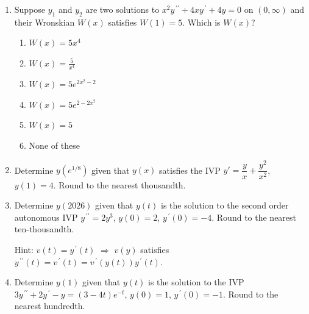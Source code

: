 \documentclass{ximera}
\newenvironment{mcenum}
{ \begin{enumerate}[itemsep=1em, topsep=1em, label=$\bigcirc$ (\alph*), align=left]
     }
{ \end{enumerate}                  }
\begin{document}
\begin{enumerate}[label=(\arabic*)]






 \item Suppose $y_1$ and $y_2$ are two solutions to $x^2 y^{\,\prime\prime}+4xy^{\,\prime}+4y=0$ on $(0,\infty)$ and their Wronskian $W(x)$ satisfies $W(1)=5$.  Which is $W(x)$?


\begin{mcenum}
\item $W(x)=5x^4$
\item $W(x)=\displaystyle \frac{5}{x^4}$ %
\item $W(x)=5e^{2x^2-2}$
\item $W(x)=5e^{2-2x^2}$
\item $W(x)=5$
\item None of these
\end{mcenum}


 \item Determine $y\left(e^{1/8}\right)$ given that $y(x)$ satisfies the IVP $y'=\dfrac{y}{x}+\dfrac{y^2}{x^2}$, $y(1)=4$. Round to the nearest thousandth.
     
 


\item Determine $y(2026)$ given that $y(t)$ is the solution to the second order autonomous IVP $y^{\,\prime\prime}=2y^3$, $y(0)=2$, $y^{\,\prime}(0)=-4$.  Round to the nearest ten-thousandth.


Hint: $v(t)=y^{\,\prime}(t)$ $\Rightarrow$ $v(y)$ satisfies $y^{\,\prime\prime}(t)=v^{\,\prime}(t)=v^{\,\prime}(y(t))y^{\,\prime}(t)$.  




\item Determine $y(1)$ given that $y(t)$ is the solution to the IVP \\$3y^{\,\prime\prime}+2y^{\,\prime}-y=(3-4t)e^{-t}$, $y(0)=1$, $y^{\,\prime}(0)=-1$.  Round to the nearest hundredth.




\end{enumerate}
\end{document}
